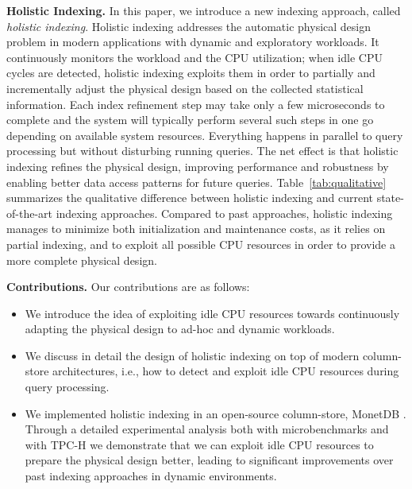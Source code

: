 
\textbf{Holistic Indexing.} In this paper, we introduce a new indexing approach, 
called \emph{holistic indexing}.
Holistic indexing  addresses the automatic physical design problem in 
modern applications with  dynamic and exploratory workloads.
It continuously monitors the workload and the CPU utilization; 
when idle CPU cycles are detected, holistic indexing exploits them in order to partially and incrementally 
adjust the physical design based on the collected statistical information.
Each index refinement step may take only a few microseconds to complete and the system will typically perform
several such steps in one go depending on available system resources.
Everything happens in parallel to query processing but without disturbing running queries.
The net effect is that holistic indexing refines the physical design,
improving performance and robustness by enabling better data access patterns for future queries.
Table~\ref{tab:qualitative} summarizes the qualitative difference between holistic indexing and current state-of-the-art indexing approaches.
Compared to past approaches, holistic indexing manages to minimize both initialization and maintenance costs, 
as it relies on partial indexing, and to exploit all possible CPU resources
in order to provide a more complete physical design.

\textbf{Contributions.}
Our contributions are as follows:
\vspace{-0.5em}
\begin{itemize}
  \setlength{\itemsep}{0pt}
  \setlength{\parskip}{0pt}
  \setlength{\parsep}{0pt}
\item We introduce the idea of exploiting idle CPU resources towards 
continuously adapting the physical design to ad-hoc and dynamic workloads.
\item We discuss  in detail the design of holistic indexing on top of modern column-store architectures, i.e.,
how to detect and exploit idle CPU resources during query processing.
\item We implemented holistic indexing in  an open-source column-store, MonetDB \cite{DBLP:journals/debu/IdreosGNMMK12, monetdb}.
Through a detailed experimental analysis both with microbenchmarks and with TPC-H 
we demonstrate that we can exploit idle CPU resources to prepare the physical design better,
leading to significant improvements over past indexing approaches in dynamic environments. 
\end{itemize}
\vspace{-0.5em}

